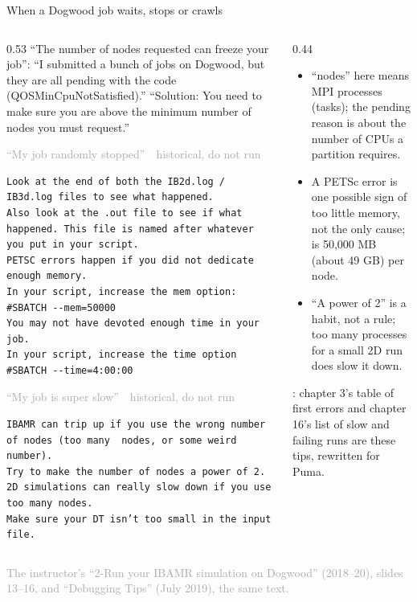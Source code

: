 \documentclass[aspectratio=169,11pt]{beamer}
\newcommand{\sourcecredit}[1]{\vfill\begin{flushright}\tiny\textcolor{DarkGray}{#1}\end{flushright}}
\newcommand{\hist}[1]{{\tiny\sffamily\textcolor{DarkGray}{#1\ \textbullet\ historical, do not run}}\par\nointerlineskip\vspace{0.3mm}}
\begin{document}
\begin{frame}[fragile]{When a Dogwood job waits, stops or crawls}
\label{fr:dwdebug}
\begin{columns}[T,onlytextwidth]
\begin{column}{0.53\textwidth}
\scriptsize ``The number of nodes requested can freeze your job'': ``I submitted a bunch of jobs on Dogwood, but they are all pending with the code (QOSMinCpuNotSatisfied).'' ``Solution: You need to make sure you are above the minimum number of nodes you must request.''
\par\vspace{0.5mm}
\hist{``My job randomly stopped''}
\begin{lstlisting}[style=hist]
Look at the end of both the IB2d.log / IB3d.log files to see what happened.
Also look at the .out file to see if what happened. This file is named after whatever you put in your script.
PETSC errors happen if you did not dedicate enough memory.
In your script, increase the mem option:
#SBATCH --mem=50000
You may not have devoted enough time in your job.
In your script, increase the time option
#SBATCH --time=4:00:00
\end{lstlisting}
\hist{``My job is super slow''}
\begin{lstlisting}[style=hist]
IBAMR can trip up if you use the wrong number of nodes (too many  nodes, or some weird number).
Try to make the number of nodes a power of 2.
2D simulations can really slow down if you use too many nodes.
Make sure your DT isn’t too small in the input file.
\end{lstlisting}
\end{column}
\begin{column}{0.44\textwidth}
\scriptsize
\begin{itemize}\setlength{\itemsep}{2pt}
  \item ``nodes'' here means MPI processes (tasks); the pending reason is about the number of CPUs a partition requires.
  \item A PETSc error is one possible sign of too little memory, not the only cause;  is 50{,}000 MB (about 49 GB) per node.
  \item ``A power of 2'' is a habit, not a rule; too many processes for a small 2D run does slow it down.
\end{itemize}
\vspace{1mm}
: chapter 3's table of first errors and chapter 16's list of slow and failing runs are these tips, rewritten for Puma.
\end{column}
\end{columns}
\sourcecredit{The instructor's ``2-Run your IBAMR simulation on Dogwood'' (2018--20), slides 13--16, and ``Debugging Tips'' (July 2019), the same text.}
\end{frame}
\end{document}
